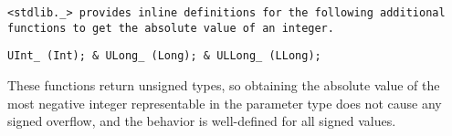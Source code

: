 \tt{<stdlib._>} provides inline definitions for the following
additional functions to get the absolute value of an integer.


\tt  {UInt_} \tt{(Int);}  &
\tt {ULong_} \tt{(Long);} &
\tt{ULLong_} \tt{(LLong);}\\

\elbat

These functions return unsigned types, so obtaining the absolute value of the
most negative integer representable in the parameter type does not cause any
signed overflow, and the behavior is well-defined for all signed values.
